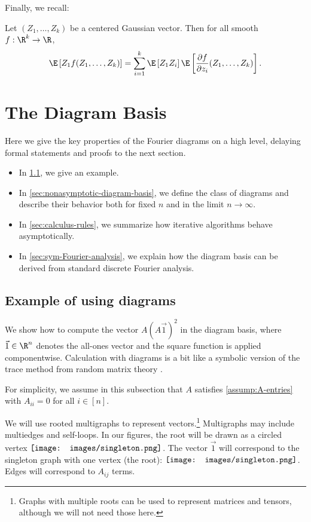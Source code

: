 \documentclass[12pt]{article}
\newcommand{\rootpic}{\vcenter{\hbox{\texttt{[image: images/singleton.png]}}}}
\begin{document}
Finally, we recall:

\begin{lemma}
    \label{lem:gaussian-ipp}
    Let $(Z_1,\ldots,Z_k)$ be a centered Gaussian vector. Then for all smooth $f:\R^k\to\R$,
    \[
        \E \left[Z_1 f(Z_1,\ldots,Z_k)\right] = \sum_{i=1}^k \E \left[Z_1 Z_i\right]\E \left[\frac{\partial f}{\partial z_i}(Z_1,\ldots,Z_k)\right].
    \]
\end{lemma}
 
\section{The Diagram Basis}
\label{sec:diagram-calculus}

Here we give the key properties of the Fourier diagrams on a high level, delaying formal statements and proofs to the next section.
\begin{itemize}
    \item In \cref{sec:example}, we give an example.
    \item In \cref{sec:nonasymptotic-diagram-basis}, we define the class of diagrams and describe their behavior both for fixed $n$ and in the limit $n\to\infty$. 
    \item In \cref{sec:calculus-rules}, we summarize how iterative algorithms behave asymptotically.
    \item In \cref{sec:sym-Fourier-analysis}, we explain how the diagram basis can be derived from standard discrete Fourier analysis.
\end{itemize}


\subsection{Example of using diagrams}
\label{sec:example}


We show how to compute the vector $A(A\vec{1})^{2}$ in the diagram basis, where $\vec{1} \in \R^n$ denotes the all-ones vector and the square function is applied componentwise.
Calculation with diagrams is a bit like a symbolic version of the trace method from random matrix theory \cite{bordenave2019lecture}.

For simplicity, we assume in this subsection that $A$ satisfies \cref{assump:A-entries} with $A_{ii}=0$ for all $i\in [n]$.

We will use {rooted} multigraphs to represent vectors.\footnote{Graphs with multiple
roots can be used to represent matrices and tensors, although
we will not need those here.}
Multigraphs may include multiedges and self-loops.
In our figures, the root will be drawn as a circled vertex $\rootpic$. The vector $\vec{1}$ will correspond to the singleton graph with one vertex (the root): $\rootpic$.
Edges will correspond to $A_{ij}$ terms.
\end{document}
